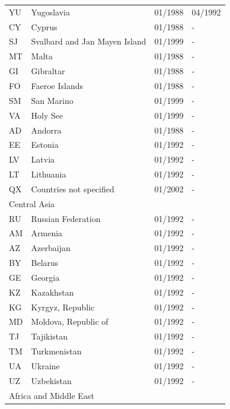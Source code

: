 \begin{footnotesize}
\begin{longtable}{lp{8cm}p{2cm}p{2cm}}
	YU   &   Yugoslavia                       &   01/1988   &   04/1992  \\
	CY   &   Cyprus                           &   01/1988   &   -  \\
	SJ   &   Svalbard and Jan Mayen Island    &   01/1999   &   -  \\
	MT   &   Malta                            &   01/1988   &   -  \\
	GI   &   Gibraltar                        &   01/1988   &   -  \\
	FO   &   Faeroe Islands                   &   01/1988   &   -  \\
	SM   &   San Marino                       &   01/1999   &   -  \\
	VA   &   Holy See                         &   01/1999   &   -  \\
	AD   &   Andorra                          &   01/1988   &   -  \\
	EE   &   Estonia                          &   01/1992   &   -  \\
	LV   &   Latvia                           &   01/1992   &   -  \\
	LT   &   Lithuania                        &   01/1992   &   -  \\
	QX   &   Countries not specified          &   01/2002   &   -  \\
  \midrule
  \multicolumn{3}{l}{Central Asia}  &  \\
	RU & Russian Federation   & 01/1992 & -  \\
	AM & Armenia              & 01/1992 & -  \\
	AZ & Azerbaijan           & 01/1992 & -  \\
	BY & Belarus              & 01/1992 & -  \\
	GE & Georgia              & 01/1992 & -  \\
	KZ & Kazakhstan           & 01/1992 & -  \\
	KG & Kyrgyz, Republic     & 01/1992 & -  \\
	MD & Moldova, Republic of & 01/1992 & -  \\
	TJ & Tajikistan           & 01/1992 & -  \\
	TM & Turkmenistan         & 01/1992 & -  \\
	UA & Ukraine              & 01/1992 & -  \\
	UZ & Uzbekistan           & 01/1992 & -  \\
	\midrule
	\multicolumn{3}{l}{Africa and Middle East}  &  \\

\end{longtable}
\end{footnotesize}
